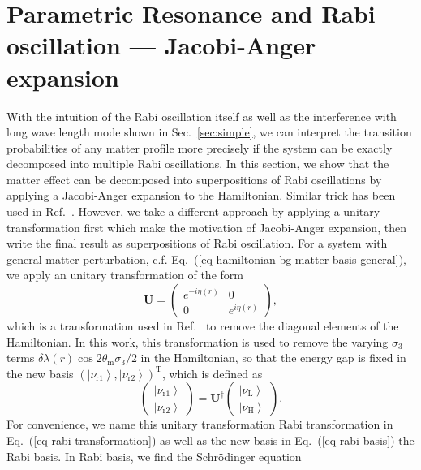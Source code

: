 \documentclass[%
reprint,
 amsmath,amssymb,
 aps,
]{revtex4-1}
\newcommand{\ket}[1]{\left| #1\right\rangle}
\begin{document}
\section{\label{sec:jacobi}Parametric Resonance and Rabi oscillation --- Jacobi-Anger expansion}


With the intuition of the Rabi oscillation itself as well as the interference with long wave length mode shown in Sec.~\ref{sec:simple}, we can interpret the transition probabilities of any matter profile more precisely if the system can be exactly decomposed into multiple Rabi oscillations. In this section, we show that the matter effect can be decomposed into superpositions of Rabi oscillations by applying a Jacobi-Anger expansion to the Hamiltonian. Similar trick has been used in Ref.~. However, we take a different approach by applying a unitary transformation first which make the motivation of Jacobi-Anger expansion, then write the final result as superpositions of Rabi oscillation. For a system with general matter perturbation, c.f. Eq.~(\ref{eq-hamiltonian-bg-matter-basis-general}), we apply an unitary transformation of the form
\begin{equation}
    \mathbf{U} =  \begin{pmatrix} e^{-i \eta (r)} & 0 \\  0 & e^{i \eta (r)}  \end{pmatrix},
    \label{eq-rabi-transformation}
\end{equation}
which is a transformation used in Ref.~ to remove the diagonal elements of the Hamiltonian. In this work, this transformation is used to remove the varying $\sigma_3$ terms $\delta\lambda(r) \cos 2\theta_{\mathrm m} \sigma_3/2$ in the Hamiltonian, so that the energy gap is fixed in the new basis $\left(\ket{\nu_{\mathrm{r1}}},\ket{\nu_{\mathrm{r2}}}\right)^{\mathrm{T}}$, which is defined as
\begin{equation}
    \begin{pmatrix} \ket{\nu_{\mathrm{r1}}}\\ \ket{\nu_{\mathrm{r2}}} \end{pmatrix} =  \mathbf{U}^\dagger \begin{pmatrix} \ket{\nu_{\mathrm{L}}} \\ \ket{\nu_{\mathrm{H}}} \end{pmatrix}.
    \label{eq-rabi-basis}
\end{equation}
For convenience, we name this unitary transformation Rabi transformation in Eq.~(\ref{eq-rabi-transformation}) as well as the new basis in Eq.~(\ref{eq-rabi-basis}) the Rabi basis. In Rabi basis, we find the Schr\"{o}dinger equation
\end{document}
